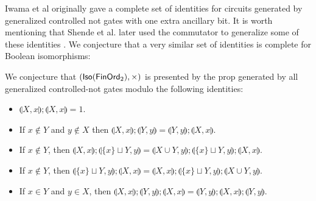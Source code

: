 Iwama et al \cite{iwama} originally gave a complete set of identities for circuits generated by generalized controlled not gates with one extra ancillary bit.  It is worth mentioning that Shende et al. later used the commutator to generalize some of these identities \cite[Corollary 26]{shende}.  We conjecture that a very similar set of identities is complete for Boolean isomorphisms: 
\begin{conjecture}
We conjecture that $({\sf Iso}(\mathsf{FinOrd}_2),\times)$ is presented by the prop generated by all generalized controlled-not gates modulo the following identities:
\begin{itemize}
\item $\llparenthesis X,x\rrparenthesis ; \llparenthesis X,x \rrparenthesis= 1$.
\item
If  $x \notin Y $ and $ y \notin X$ then $\llparenthesis X,x\rrparenthesis ;\llparenthesis Y,y\rrparenthesis =\llparenthesis Y,y\rrparenthesis; \llparenthesis X,x\rrparenthesis $.
%
\item
If $x \notin Y$, then $\llparenthesis X,x\rrparenthesis; \llparenthesis \{x\} \sqcup Y, y\rrparenthesis = \llparenthesis X\cup Y,y\rrparenthesis ; \llparenthesis \{x\} \sqcup Y, y\rrparenthesis;  \llparenthesis X,x\rrparenthesis $.
\item
If $x \notin Y$, then $ \llparenthesis \{x\} \sqcup Y, y\rrparenthesis ; \llparenthesis X,x\rrparenthesis = \llparenthesis X,x\rrparenthesis;   \llparenthesis \{x\} \sqcup Y, y\rrparenthesis ; \llparenthesis X\cup Y,y\rrparenthesis $.
\item
If $x \in Y$ and $y \in X$, then
$
\llparenthesis  X,x \rrparenthesis ; \llparenthesis  Y,y \rrparenthesis ;  \llparenthesis  X,x \rrparenthesis 
=
\llparenthesis  Y,y \rrparenthesis ;  \llparenthesis  X,x \rrparenthesis ;  \llparenthesis  Y,y \rrparenthesis 
$.
\end{itemize}
\end{conjecture}
